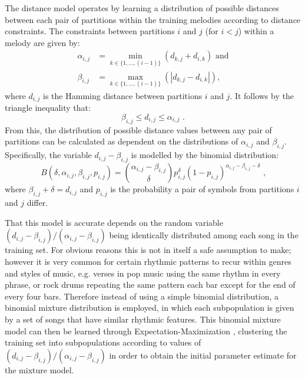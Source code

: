 \documentclass[ author={Stephen Livermore-Tozer},
				supervisor={Dr. Peter Flach},
				degree={MEng},
				title={Algorithmic Co-composition Using Machine Learning},
				subtitle={},
				type={research},
				year={2016} ]{dissertation}
\begin{document}
	
	The distance model operates by learning a distribution of possible distances between each pair of partitions within the training melodies according to distance constraints. The constraints between partitions $i$ and $j$ (for $i<j$) within a melody are given by:
	\begin{equation*}
		\begin{split}
		\alpha_{i,j} &= \min_{k \in \{1,\dots,(i-1)\}} (d_{k,j} + d_{i,k}) \text{ and} \\
		\beta_{i,j} &= \max_{k \in \{1,\dots,(i-1)\}} (|d_{k,j} - d_{i,k}|),
		\end{split}
	\end{equation*}
	where $d_{i,j}$ is the Hamming distance between partitions $i$ and $j$. It follows by the triangle inequality that:
	$$\beta_{i,j} \leq d_{i,j} \leq \alpha_{i,j} \text{ .}$$
	From this, the distribution of possible distance values between any pair of partitions can be calculated as dependent on the distributions of $\alpha_{i,j}$ and $\beta_{i,j}$. Specifically, the variable $d_{i,j} - \beta_{i,j}$ is modelled by the binomial distribution:
	$$B(\delta, \alpha_{i,j}, \beta_{i,j}, p_{i,j}) = \binom{\alpha_{i,j} - \beta_{i,j}}{\delta} p_{i,j}^\delta (1-p_{i,j})^{\alpha_{i,j}-\beta_{i,j}-\delta} \text{ ,}$$
	where $\beta_{i,j} + \delta = d_{i,j}$ and $p_{i,j}$ is the probability a pair of symbols from partitions $i$ and $j$ differ. 
	
	That this model is accurate depends on the random variable $(d_{i,j}-\beta_{i,j})/(\alpha_{i,j}-\beta_{i,j})$ being identically distributed among each song in the training set. For obvious reasons this is not in itself a safe assumption to make; however it is very common for certain rhythmic patterns to recur within genres and styles of music, e.g. verses in pop music using the same rhythm in every phrase, or rock drums repeating the same pattern each bar except for the end of every four bars. Therefore instead of using a simple binomial distribution, a binomial mixture distribution is employed, in which each subpopulation is given by a set of songs that have similar rhythmic features. This binomial mixture model can then be learned through Expectation-Maximization \cite{bilmes1998gentle}, clustering the training set into subpopulations according to values of $(d_{i,j}-\beta_{i,j})/(\alpha_{i,j}-\beta_{i,j})$ in order to obtain the initial parameter estimate for the mixture model.
	
\end{document}
